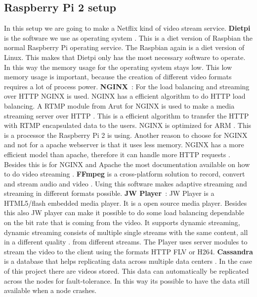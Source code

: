 \documentclass{sig-alternate-br}
\begin{document}
\subsection{Raspberry Pi 2 setup}\label{sec:setup}
In this setup we are going to make a Netflix kind of video stream service. \newline
\textbf{Dietpi} is the software we use as operating system \cite{dietpi}. This is a diet version of Raspbian the normal Raspberry Pi operating service. The Raspbian again is a diet version of Linux. This makes that Dietpi only has the most necessary software to operate. In this way the memory usage for the operating system stays low. This low memory usage is important, because the creation of different video formats requires a lot of process power. \newline
\textbf{NGINX}~\cite{nginx}: For the load balancing and streaming over HTTP NGINX is used. NGINX has a efficient algorithm to do HTTP load balancing. A RTMP module from Arut for NGINX is used to make a media streaming server over HTTP \cite{arut}. This is a efficient algorithm to transfer the HTTP with RTMP encapsulated data to the users. NGINX is optimized for ARM \cite{nginx}. This is a processor the Raspberry Pi 2 is using. Another reason to choose for NGINX and not for a apache webserver is that it uses less memory. NGINX has a more efficient model than apache, therefore it can handle more HTTP requests \cite{nginxvsapache}. Besides this is for NGINX and Apache the most documentation available on how to do video streaming \cite{nginxvsapache}. \newline
\textbf{FFmpeg} is a cross-platform solution to record, convert and stream audio and video \cite{ffmpeg}. Using this software makes adaptive streaming and streaming in different formats possible. \newline
\textbf{JW Player}~\cite{jwplayer}: JW Player is a HTML5/flash embedded media player. It is a open source media player. Besides this also JW player can make it possible to do some load balancing dependable on the bit rate that is coming from the video. It supports dynamic streaming, dynamic streaming consists of multiple single streams with the same content, all in a different quality \cite{jwplayer}. from different streams. The Player uses server modules to stream the video to the client using the formats HTTP FLV or H264.\newline
\textbf{Cassandra} is a database that helps replicating data across multiple data centers \cite{cassandra}. In the case of this project there are videos stored. This data can automatically be replicated across the nodes for fault-tolerance. In this way its possible to have the data still available when a node crashes.
\end{document}
